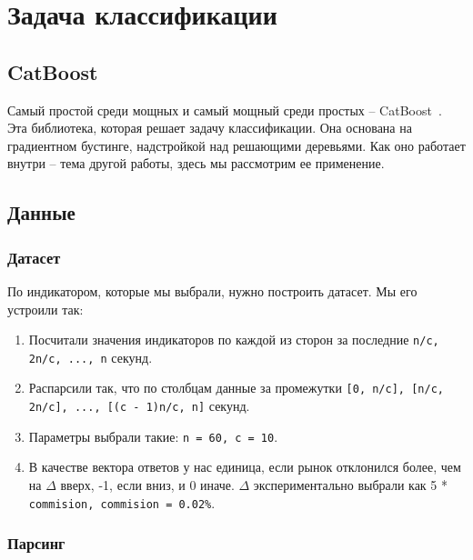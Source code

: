 \section{Задача классификации}

\subsection{CatBoost}

Самый простой среди мощных и самый мощный среди простых -- CatBoost~\cite{CatboostDocs}. Эта библиотека, которая решает задачу классификации. Она основана на градиентном бустинге, надстройкой над решающими деревьями. Как оно работает внутри -- тема другой работы, здесь мы рассмотрим ее применение.

\subsection{Данные}

\subsubsection{Датасет}

По индикатором, которые мы выбрали, нужно построить датасет. Мы его устроили так:

\begin{enumerate}

    \item Посчитали значения индикаторов по каждой из сторон за последние \texttt{n/c, 2n/c, ..., n} секунд.
    
    \item Распарсили так, что по столбцам данные за промежутки \texttt{[0, n/c], [n/c, 2n/c], ..., [(c - 1)n/c, n]} секунд.
    
    \item Параметры выбрали такие: \texttt{n = 60, c = 10}.
    
    \item В качестве вектора ответов у нас единица, если рынок отклонился более, чем на $\Delta$ вверх, -1, если вниз, и 0 иначе. $\Delta$ экспериментально выбрали как 5 * \texttt{commision, commision = 0.02\%}.
    
\end{enumerate}

\subsubsection{Парсинг}

